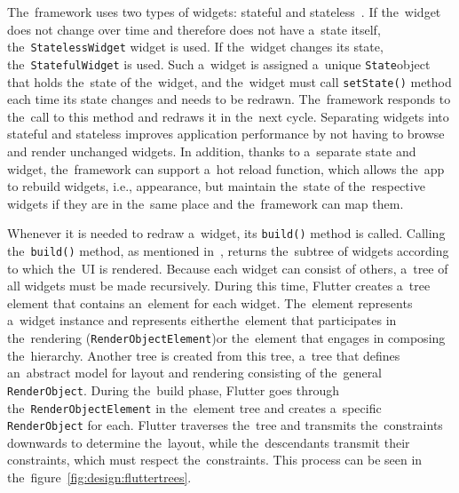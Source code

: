 The~framework uses two types of widgets: stateful and stateless~\cite{a2022_flutter_architecture}.
\linebreak
If the~widget does not change over time and therefore does not have a~state itself, the~\texttt{StatelessWidget} widget is used.
If the~widget changes its state, the~\texttt{StatefulWidget} is used.
Such a~widget is assigned a~unique \texttt{State}\linebreak{}object that holds the~state of the~widget, and the~widget must call \texttt{setState()} method each time its state changes and needs to be redrawn.
The~framework responds to the~call to this method and redraws it in the~next cycle.
Separating widgets into stateful and stateless improves application performance by not having to browse and render unchanged widgets.
In addition, thanks to a~separate state and widget, the~framework can support a~hot reload function, which allows the~app to rebuild widgets, i.e., appearance, but maintain the~state of the~respective widgets if they are in the~same place and the~framework can map them.

Whenever it is needed to redraw a~widget, its \texttt{build()} method is called.
Calling the~\texttt{build()} method, as mentioned in~\cite{a2022_flutter_architecture}, returns the~subtree of widgets according to which the~UI is rendered.
Because each widget can consist of others, a~tree of all widgets must be made recursively.
During this time, Flutter creates a~tree element that contains an~element for each widget.
\linebreak
The~element represents a~widget instance and represents either\linebreak{}the~element that participates in the~rendering (\texttt{RenderObjectElement})\linebreak{}or the~element that engages in composing the~hierarchy.
Another tree is created from this tree, a~tree that defines an~abstract model for layout and rendering consisting of the~general \texttt{RenderObject}.
During the~build phase, Flutter goes through the~\texttt{RenderObjectElement} in the~element tree and creates a~specific \texttt{RenderObject} for each.
Flutter traverses the~tree and transmits the~constraints downwards to determine the~layout, while the~descendants transmit their constraints, which must respect the~constraints.
This process can be seen in the~figure~\ref{fig:design:fluttertrees}.

